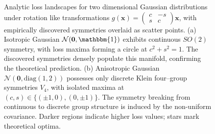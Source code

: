 \begin{figure}
\begin{subfigure}[b]{0.45\textwidth}
    \end{subfigure}
    \caption[Loss landscapes demonstrating \textsc{SymmetryGAN's} ability to discover continuous $SO(2)$ and discrete $V_4$ symmetries in isotropic and anisotropic 2D Gaussians.]{Analytic loss landscapes for two dimensional Gaussian distributions under rotation like transformations $g(\mathbf{x}) = \begin{pmatrix} c & -s \\ s & c \end{pmatrix}\mathbf{x}$, with empirically discovered symmetries overlaid as scatter points. (a) Isotropic Gaussian $\mathcal{N}(\mathbf{0}, \mathbbm{1})$ exhibits continuous $SO(2)$ symmetry, with loss maxima forming a circle at $c^2 + s^2 = 1$. The discovered symmetries densely populate this manifold, confirming the theoretical prediction. (b) Anisotropic Gaussian $\mathcal{N}(\mathbf{0}, \text{diag}(1,2))$ possesses only discrete Klein four--group symmetries $V_4$, with isolated maxima at $(c,s) \in \{(\pm 1, 0), (0, \pm 1)\}$. The symmetry breaking from continuous to discrete group structure is induced by the non-uniform covariance. Darker regions indicate higher loss values; stars mark theoretical optima.}
    \label{fig:SO2}
\end{figure}
